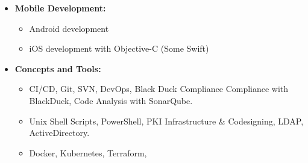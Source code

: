 \documentclass{article}
\begin{document}
\begin{itemize}
    \item \textbf{Mobile Development:} 
        \begin{itemize}
            \item Android development
            \item iOS development with Objective-C (Some Swift)
        \end{itemize}

    \item \textbf{Concepts and Tools:} 
        \begin{itemize}
            \item CI/CD, Git, SVN, DevOps, Black Duck Compliance Compliance with BlackDuck, Code Analysis with SonarQube.
            \item Unix Shell Scripts, PowerShell, PKI Infrastructure \& Codesigning, LDAP, ActiveDirectory.
            \item Docker, Kubernetes, Terraform,
        \end{itemize}
\end{itemize}
\end{document}
